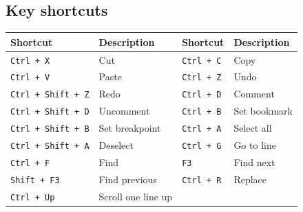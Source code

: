     \subsection{Key shortcuts}
        \begin{table}[h!]
            \centering
            \fontsize{8pt}{9pt}
            {
                \begin{tabular}{|ll|ll|}
                    \hline
                    \textbf{Shortcut}                       & \textbf{Description}          &
                    \textbf{Shortcut}                       & \textbf{Description}          \\\hline
                        \texttt{Ctrl + X}                   & Cut                           &
                        \texttt{Ctrl + C}                   & Copy                          \\
                        \texttt{Ctrl + V}                   & Paste                         &
                        \texttt{Ctrl + Z}                   & Undo                          \\
                        \texttt{Ctrl + Shift + Z}           & Redo                          &
                        \texttt{Ctrl + D}                   & Comment                       \\
                        \texttt{Ctrl + Shift + D}           & Uncomment                     &
                        \texttt{Ctrl + B}                   & Set bookmark                  \\
                        \texttt{Ctrl + Shift + B}           & Set breakpoint                &
                        \texttt{Ctrl + A}                   & Select all                    \\
                        \texttt{Ctrl + Shift + A}           & Deselect                      &
                        \texttt{Ctrl + G}                   & Go to line                    \\
                        \texttt{Ctrl + F}                   & Find                          &
                        \texttt{F3}                         & Find next                     \\
                        \texttt{Shift + F3}                 & Find previous                 &
                        \texttt{Ctrl + R}                   & Replace                       \\
                        \texttt{Ctrl + Up}                  & Scroll one line up            &

\end{tabular}}
\end{table}
